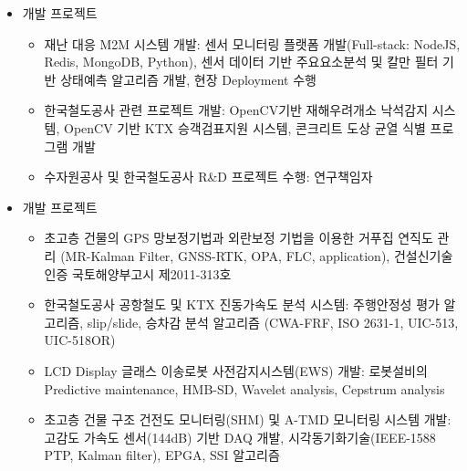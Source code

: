 \begin{itemize}[label=]
	\item 개발 프로젝트
	      \begin{itemize}[label=]
		      \item 재난 대응 M2M 시스템 개발: 센서 모니터링 플랫폼 개발(Full-stack: NodeJS, Redis, MongoDB, Python), 센서 데이터 기반 주요요소분석 및 칼만 필터 기반 상태예측 알고리즘 개발, 현장 Deployment 수행
		      \item 한국철도공사 관련 프로젝트 개발: OpenCV기반 재해우려개소 낙석감지 시스템, OpenCV 기반 KTX 승객검표지원 시스템, 콘크리트 도상 균열 식별 프로그램 개발
		      \item 수자원공사 및 한국철도공사 R\&D 프로젝트 수행: 연구책임자
	      \end{itemize}
\end{itemize}

\divider

\begin{itemize}[label=]
	\item 개발 프로젝트
	      \begin{itemize}[label=]
		      \item 초고층 건물의 GPS 망보정기법과 외란보정 기법을 이용한 거푸집 연직도 관리 (MR-Kalman Filter, GNSS-RTK, OPA, FLC, application), 건설신기술 인증 국토해양부고시 제2011-313호
		      \item 한국철도공사 공항철도 및 KTX 진동가속도 분석 시스템: 주행안정성 평가 알고리즘, slip/slide, 승차감 분석 알고리즘 (CWA-FRF, ISO 2631-1, UIC-513, UIC-518OR)
		      \item LCD Display 글래스 이송로봇 사전감지시스템(EWS) 개발: 로봇설비의 Predictive maintenance, HMB-SD, Wavelet analysis, Cepstrum analysis
		      \item 초고층 건물 구조 건전도 모니터링(SHM) 및 A-TMD 모니터링 시스템 개발: 고감도 가속도 센서(144dB) 기반 DAQ 개발, 시각동기화기술(IEEE-1588 PTP, Kalman filter), EPGA, SSI 알고리즘
	      \end{itemize}
\end{itemize}